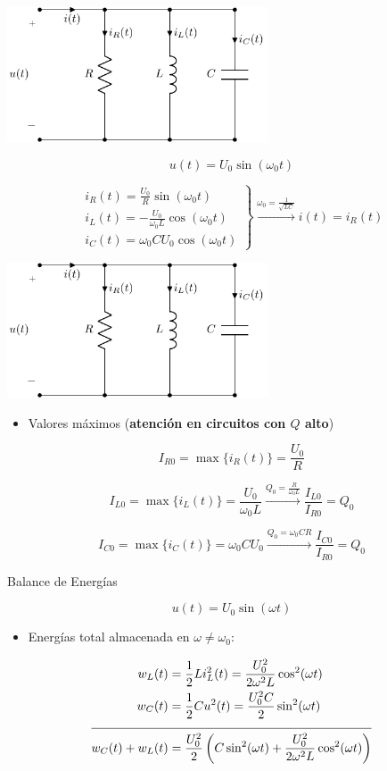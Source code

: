 \begin{center}
\includegraphics[height=4cm]{../figs/RLC_paralelo_resonante.pdf}
\end{center}

\[
  u(t) = U_0 \sin(\omega_0 t)
\]

\[
\left.
\begin{array}{l}
  i_R(t) = \frac{U_0}{R} \sin(\omega_0 t)\\
  i_L(t) = - \frac{U_0}{\omega_0 L} \cos(\omega_0 t)\\
  i_C(t) = \omega_0 C U_0 \cos(\omega_0 t)
\end{array}
\right\} \xrightarrow{\omega_0 = \frac{1}{\sqrt{LC}}} \boxed{i(t) = i_R(t)}
\]

\begin{center}
\includegraphics[height=4cm]{../figs/RLC_paralelo_resonante.pdf}
\end{center}

\begin{itemize}
\item Valores máximos (\textbf{atención en circuitos con \(Q\) alto})
\end{itemize}
\[
  I_{R0} = \max\{i_R(t)\} = \frac{U_0}{R}
\]

\[
  I_{L0} = \max\{i_L(t)\} = \frac{U_0}{\omega_0 L} \xrightarrow{Q_0 = \frac{R}{\omega_0L}} \boxed{\frac{I_{L0}}{I_{R0}} = Q_0}
\]

\[
  I_{C0} = \max\{i_C(t)\} = \omega_0 C U_0 \xrightarrow{Q_0 = \omega_0CR} \boxed{\frac{I_{C0}}{I_{R0}} = Q_0}
\]

{Balance de Energías}

\[
  u(t) = U_0 \sin(\omega t)
\]

\begin{itemize}
\item Energías total almacenada en \(\omega \neq \omega_0\):
\end{itemize}
\begin{align*}
  w_L(t) &= \frac{1}{2} L i_L^2(t) = \frac{U_0^2}{2 \omega^2 L} \cos^2 (\omega t)\\
  w_C(t) &= \frac{1}{2} C u^2(t) = \frac{U_0^2 C}{2} \sin^2 (\omega t) \\
  \cline{1-2}
  w_C(t) + w_L(t) &= \frac{U_0^2}{2} \left(C\sin^2(\omega t) + \frac{U_0^2}{2 \omega^2 L} \cos^2(\omega t)\right)
\end{align*}

